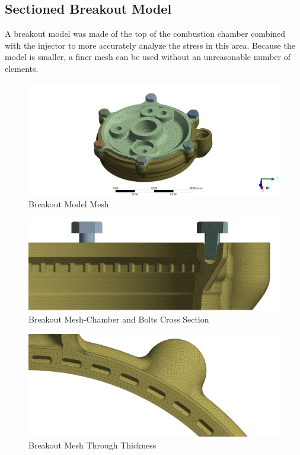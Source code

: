 \subsection{Sectioned Breakout Model
}
A breakout model was made of the top of the combustion chamber combined with the injector to more accurately analyze the stress in this area. Because the model is smaller, a finer mesh can be used without an unreasonable number of elements. 
\begin{figure}
    \centering
    \includegraphics[width=1\linewidth]{Images/Breakout Model Mesh.png}
    \caption{Breakout Model Mesh}
    \label{fig:Breakout Model Mesh}
\end{figure}
\begin{figure}
    \centering
    \includegraphics[width=1\linewidth]{Images/Breakout Mesh-Chamber and Bolts Cross Section.png}
    \caption{Breakout Mesh-Chamber and Bolts Cross Section}
    \label{fig:Breakout Mesh-Chamber and Bolts Cross Section}
\end{figure}
\begin{figure}
    \centering
    \includegraphics[width=1\linewidth]{Images/Breakout Mesh Through Thickness.png}
    \caption{Breakout Mesh Through Thickness}
    \label{fig:Breakout Mesh Through Thickness}
\end{figure}
